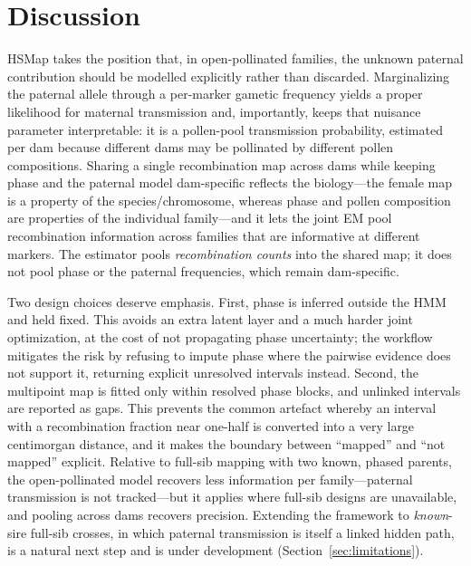 \documentclass[11pt]{article}
\begin{document}
\section{Discussion}
\textsf{HSMap} takes the position that, in open-pollinated families, the unknown
paternal contribution should be modelled explicitly rather than discarded. Marginalizing
the paternal allele through a per-marker gametic frequency yields a proper likelihood for
maternal transmission and, importantly, keeps that nuisance parameter interpretable: it
is a pollen-pool transmission probability, estimated per dam because different dams may be
pollinated by different pollen compositions. Sharing a single recombination map across
dams while keeping phase and the paternal model dam-specific reflects the biology---the
female map is a property of the species/chromosome, whereas phase and pollen composition
are properties of the individual family---and it lets the joint EM pool recombination
information across families that are informative at different markers. The estimator pools
\emph{recombination counts} into the shared map; it does not pool phase or the paternal
frequencies, which remain dam-specific.

Two design choices deserve emphasis. First, phase is inferred outside the HMM and held
fixed. This avoids an extra latent layer and a much harder joint optimization, at the
cost of not propagating phase uncertainty; the workflow mitigates the risk by refusing to
impute phase where the pairwise evidence does not support it, returning explicit
unresolved intervals instead. Second, the multipoint map is fitted only within resolved
phase blocks, and unlinked intervals are reported as gaps. This prevents the common
artefact whereby an interval with a recombination fraction near one-half is converted into
a very large centimorgan distance, and it makes the boundary between ``mapped'' and ``not
mapped'' explicit. Relative to full-sib mapping with two known, phased parents, the
open-pollinated model recovers less information per family---paternal transmission is not
tracked---but it applies where full-sib designs are unavailable, and pooling across dams
recovers precision. Extending the framework to \emph{known}-sire full-sib crosses, in
which paternal transmission is itself a linked hidden path, is a natural next step and is
under development (Section~\ref{sec:limitations}).
\end{document}
